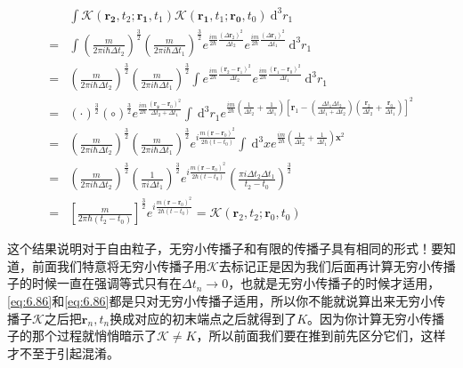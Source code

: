 \documentclass[a4paper,zihao=-4,linespread=1]{ctexrep}
\begin{document}
	\begin{equation}
		\label{eq:6.92}
		\begin{aligned}
			&\int \mathcal{K}(\mathbf{r_2},t_2;\mathbf{r_1},t_1)\mathcal{K}(\mathbf{r_1},t_1;\mathbf{r_0},t_0)\mathrm{~d}^3r_1\\
			=&\int \left(\frac{m}{2 \pi i \hbar \Delta t_2}\right)^{\frac{3}{2}}\left(\frac{m}{2 \pi i \hbar \Delta t_1}\right)^{\frac{3}{2}} e^{\frac{im}{2\hbar}\frac{({\Delta\mathbf{r}}_2)^2}{ \Delta t_2}} e^{\frac{im}{2\hbar}\frac{({\Delta\mathbf{r}}_1)^2}{ \Delta t_1}}\mathrm{~d}^3r_1\\
			=& \left(\frac{m}{2 \pi i \hbar \Delta t_2}\right)^{\frac{3}{2}}\left(\frac{m}{2 \pi i \hbar \Delta t_1}\right)^{\frac{3}{2}}\int e^{\frac{im}{2\hbar}\frac{(\mathbf{r}_2-\mathbf{r}_1)^2}{ \Delta t_2}} e^{\frac{im}{2\hbar}\frac{(\mathbf{r}_1-\mathbf{r}_0)^2}{ \Delta t_1}}\mathrm{~d}^3r_1\\
			=&(\cdot)^\frac{3}{2}(\circ)^\frac{3}{2}e^{\frac{im}{2\hbar}\frac{(\mathbf{r_2}-\mathbf{r}_0)^2}{\Delta t_2+\Delta t_1}}\int\mathrm{~d}^3r_1e^{\frac{im}{2\hbar}\left(\frac{1}{\Delta t_2}+\frac{1}{\Delta t_1}\right)\left[\mathbf{r}_1-\left(\frac{\Delta t_1\Delta t_2}{\Delta t_1+\Delta t_2}\right)\left(\frac{\mathbf{r}_2}{\Delta t_2}+\frac{\mathbf{r}_0}{\Delta t_1}\right)\right]^2}\\
			=&\left(\frac{m}{2 \pi i \hbar \Delta t_2}\right)^{\frac{3}{2}}\left(\frac{m}{2 \pi i \hbar \Delta t_1}\right)^{\frac{3}{2}}e^ {i\frac{m{{\left( \mathbf{r}-{{{\mathbf{r}}}_{0}} \right)}^{2}}}{2\hbar \left( t-{{t}_{0}} \right)} }\int\mathrm{~d}^3x e^{\frac{im}{2\hbar}\left(\frac{1}{\Delta t_2}+\frac{1}{\Delta t_1}\right)\mathbf{x}^2}\\
			=&\left(\frac{m}{2 \pi i \hbar \Delta t_2}\right)^{\frac{3}{2}}\left(\frac{1}{\pi i  \Delta t_1}\right)^{\frac{3}{2}}e^ {i\frac{m{{\left( \mathbf{r}-{{{\mathbf{r}}}_{0}} \right)}^{2}}}{2\hbar \left( t-{{t}_{0}} \right)}}\left(\frac{\pi i\Delta t_2\Delta t_1}{t_2-t_0}\right)^\frac{3}{2}\\
			=&\left[\frac{m}{2\pi\hbar(t_2-t_0)}\right]^\frac{3}{2}e^ {i\frac{m{{\left( \mathbf{r}-{{{\mathbf{r}}}_{0}} \right)}^{2}}}{2\hbar \left( t-{{t}_{0}} \right)}}=\mathcal{K}(\mathbf{r}_2,t_2;\mathbf{r}_0,t_0)
		\end{aligned}
	\end{equation}

	这个结果说明对于自由粒子，无穷小传播子和有限的传播子具有相同的形式！要知道，前面我们特意将无穷小传播子用$\mathcal{K}$去标记正是因为我们后面再计算无穷小传播子的时候一直在强调等式只有在$\Delta t_n\to 0$，也就是无穷小传播子的时候才适用，\ref{eq:6.86}和\ref{eq:6.86}都是只对无穷小传播子适用，所以你不能就说算出来无穷小传播子$\mathcal{K}$之后把$\mathbf{r}_n,t_n$换成对应的初末端点之后就得到了$K$。因为你计算无穷小传播子的那个过程就悄悄暗示了$\mathcal{K}\neq K$，所以前面我们要在推到前先区分它们，这样才不至于引起混淆。
	
\end{document}
